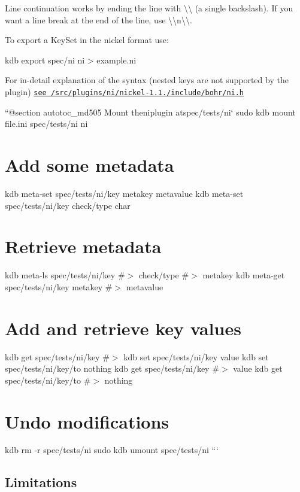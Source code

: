 Line continuation works by ending the line with {\ttfamily \textbackslash{}\textbackslash{}} (a single backslash). If you want a line break at the end of the line, use {\ttfamily \textbackslash{}\textbackslash{}n\textbackslash{}\textbackslash{}}.

To export a {\ttfamily Key\+Set} in the nickel format use\+:


\begin{DoxyCode}
kdb export spec/ni ni > example.ni
\end{DoxyCode}


For in-\/detail explanation of the syntax (nested keys are not supported by the plugin) \href{/home/jenkins/workspace/libelektra-release/src/plugins/ni/nickel-1.1.0/include/bohr/ni.h}{\tt see /src/plugins/ni/nickel-\/1.1./include/bohr/ni.h}

``{\ttfamily  @section autotoc\+\_\+md505 Mount the}ni{\ttfamily plugin at}spec/tests/ni` sudo kdb mount file.\+ini spec/tests/ni ni\hypertarget{autotoc_md502_autotoc_md506}{}\section{Add some metadata}\label{autotoc_md502_autotoc_md506}
kdb meta-\/set spec/tests/ni/key metakey metavalue kdb meta-\/set spec/tests/ni/key check/type char\hypertarget{autotoc_md502_autotoc_md507}{}\section{Retrieve metadata}\label{autotoc_md502_autotoc_md507}
kdb meta-\/ls spec/tests/ni/key \#$>$ check/type \#$>$ metakey kdb meta-\/get spec/tests/ni/key metakey \#$>$ metavalue\hypertarget{autotoc_md502_autotoc_md508}{}\section{Add and retrieve key values}\label{autotoc_md502_autotoc_md508}
kdb get spec/tests/ni/key \#$>$ kdb set spec/tests/ni/key value kdb set spec/tests/ni/key/to nothing kdb get spec/tests/ni/key \#$>$ value kdb get spec/tests/ni/key/to \#$>$ nothing\hypertarget{autotoc_md502_autotoc_md509}{}\section{Undo modifications}\label{autotoc_md502_autotoc_md509}
kdb rm -\/r spec/tests/ni sudo kdb umount spec/tests/ni ```\hypertarget{autotoc_md502_autotoc_md510}{}\subsection{Limitations}\label{autotoc_md502_autotoc_md510}

